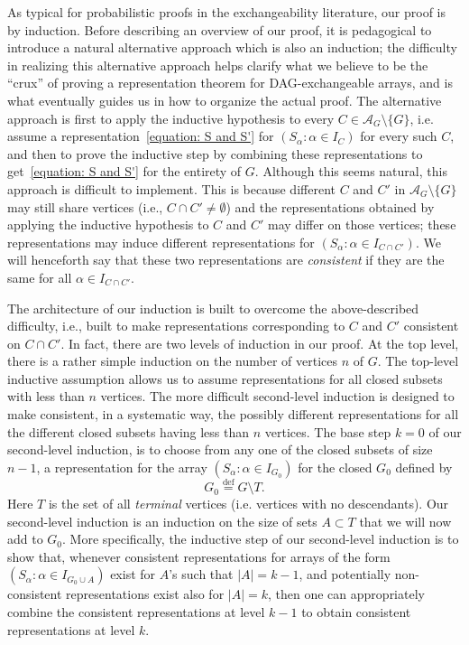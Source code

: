 \documentclass[10pt]{amsart}
\theoremstyle{definition}\newtheorem{defi}[theo]{Definition}\newtheorem{rema}[theo]{Remark}\newtheorem{exam}[theo]{Example}\newtheorem{exem}[theo]{Example}\newtheorem{nota}[theo]{Notation}
\newcommand*{\defeq}{\stackrel{\mathrm{def}}{=}}
\renewcommand{\AA}{\mathcal{A}}
\begin{document}
As typical for probabilistic proofs in the exchangeability literature, our proof is by induction. Before describing an overview of our proof, it is pedagogical to introduce a natural alternative approach which is also an induction; the difficulty in realizing this alternative approach helps clarify what we believe to be the ``crux'' of proving a representation theorem for DAG-exchangeable arrays, and is what eventually guides us in how to organize the actual proof. The alternative approach is first to apply the inductive hypothesis to every $C \in \AA_G \setminus \{G\}$, i.e. assume a representation~\eqref{equation: S and S'} for $(S_\alpha : \alpha \in I_C)$ for every such $C$, and then to prove the inductive step by combining these representations to get~\eqref{equation: S and S'} for the entirety of $G$. Although this seems natural, this approach is difficult to implement. This is because different $C$ and $C'$ in $\AA_G \setminus \{G\}$ may still share vertices (i.e., $C \cap C' \neq \emptyset$) and the representations obtained by applying the inductive hypothesis to $C$ and $C'$ may differ on those vertices; these representations may induce different representations for $(S_\alpha : \alpha \in I_{C \cap C'})$. We will henceforth say that these two representations are \emph{consistent} if they are the same for all $\alpha \in I_{C \cap C'}$.

The architecture of our induction is built to overcome the above-described difficulty, i.e., built to make representations corresponding to $C$ and $C'$ consistent on $C\cap C'$. In fact, there are two levels of induction in our proof. At the top level, there is a rather simple induction on the number of vertices $n$ of $G$. The top-level inductive assumption allows us to assume representations for all closed subsets with less than $n$ vertices. The more difficult second-level induction is designed to make consistent, in a systematic way, the possibly different representations for all the different closed subsets having less than $n$ vertices. The base step $k=0$ of our second-level induction, is to choose from any one of the closed subsets of size $n-1$, a representation for the array $(S_\alpha : \alpha \in I_{G_0})$ for the closed $G_0$ defined by
\begin{equation}\label{eqn:notation:G0}
G_0
\defeq G\setminus T.
\end{equation}
Here $T$ is the set of all \emph{terminal} vertices (i.e. vertices with no descendants). Our second-level induction is an induction on the size of sets $A\subset T$ that we will now add to $G_0$. More specifically, the inductive step of our second-level induction is to show that, whenever consistent representations for arrays of the form $(S_\alpha : \alpha \in I_{G_0\cup A})$ exist for $A$'s such that $|A|=k-1$, and potentially non-consistent representations exist also for $|A|=k$, then one can appropriately combine the consistent representations at level $k-1$ to obtain consistent representations at level $k$.
\end{document}
